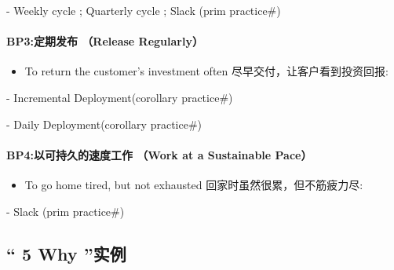 \documentclass[]{article}
\providecommand{\tightlist}{%
  \setlength{\itemsep}{0pt}\setlength{\parskip}{0pt}}
\let\oldparagraph\paragraph
\renewcommand{\paragraph}[1]{\oldparagraph{#1}\mbox{}}
\begin{document}
\begin{description}
\tightlist
\item[]
- Weekly cycle ; Quarterly cycle ; Slack (prim practice\#)
\end{description}

\hypertarget{bp3ux5b9aux671fux53d1ux5e03-release-regularly}{%
\paragraph{BP3:定期发布 （Release
Regularly）}\label{bp3ux5b9aux671fux53d1ux5e03-release-regularly}}

\begin{itemize}
\tightlist
\item
  To return the customer's investment often
  尽早交付，让客户看到投资回报:
\end{itemize}

\begin{description}
\tightlist
\item[]
- Incremental Deployment(corollary practice\#)

- Daily Deployment(corollary practice\#)
\end{description}

\hypertarget{bp4ux4ee5ux53efux6301ux4e45ux7684ux901fux5ea6ux5de5ux4f5c-work-at-a-sustainable-pace}{%
\paragraph{BP4:以可持久的速度工作 （Work at a Sustainable
Pace）}\label{bp4ux4ee5ux53efux6301ux4e45ux7684ux901fux5ea6ux5de5ux4f5c-work-at-a-sustainable-pace}}

\begin{itemize}
\tightlist
\item
  To go home tired, but not exhausted 回家时虽然很累，但不筋疲力尽:\\
\end{itemize}

\begin{description}
\tightlist
\item[]
- Slack (prim practice\#)
\end{description}

\hypertarget{why-ux5b9eux4f8b}{%
\subsection{`` 5 Why ''实例}\label{why-ux5b9eux4f8b}}
\end{document}

